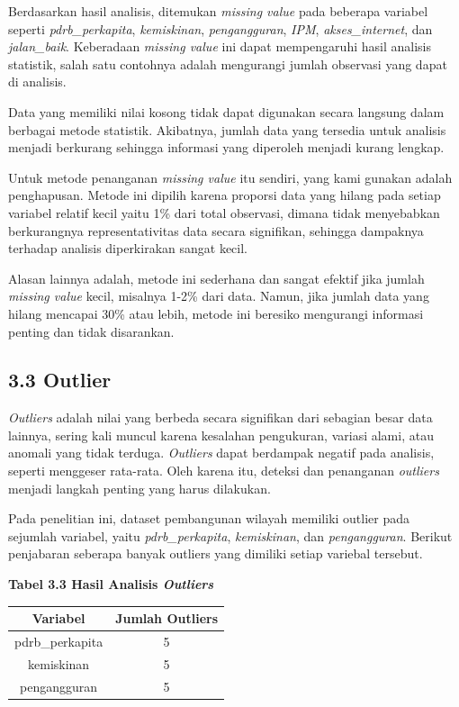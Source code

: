 \documentclass[
  12pt,
]{article}
\begin{document}
Berdasarkan hasil analisis, ditemukan \textit{missing value} pada
beberapa variabel seperti \textit{pdrb\_perkapita}, \textit{kemiskinan},
\textit{pengangguran}, \textit{IPM}, \textit{akses\_internet}, dan
\textit{jalan\_baik}. Keberadaan \textit{missing value} ini dapat
mempengaruhi hasil analisis statistik, salah satu contohnya adalah
mengurangi jumlah observasi yang dapat di analisis.

Data yang memiliki nilai kosong tidak dapat digunakan secara langsung
dalam berbagai metode statistik. Akibatnya, jumlah data yang tersedia
untuk analisis menjadi berkurang sehingga informasi yang diperoleh
menjadi kurang lengkap.

Untuk metode penanganan \textit{missing value} itu sendiri, yang kami
gunakan adalah penghapusan. Metode ini dipilih karena proporsi data yang
hilang pada setiap variabel relatif kecil yaitu 1\% dari total
observasi, dimana tidak menyebabkan berkurangnya representativitas data
secara signifikan, sehingga dampaknya terhadap analisis diperkirakan
sangat kecil.

Alasan lainnya adalah, metode ini sederhana dan sangat efektif jika
jumlah \textit{missing value} kecil, misalnya 1-2\% dari data. Namun,
jika jumlah data yang hilang mencapai 30\% atau lebih, metode ini
beresiko mengurangi informasi penting dan tidak disarankan.

\subsection{\texorpdfstring{\normalsize 3.3 \hspace {0,5cm}
Outlier}{3.3  Outlier}}\label{outlier}

\textit{Outliers} adalah nilai yang berbeda secara signifikan dari
sebagian besar data lainnya, sering kali muncul karena kesalahan
pengukuran, variasi alami, atau anomali yang tidak terduga.
\textit{Outliers} dapat berdampak negatif pada analisis, seperti
menggeser rata-rata. Oleh karena itu, deteksi dan penanganan
\textit{outliers} menjadi langkah penting yang harus dilakukan.

Pada penelitian ini, dataset pembangunan wilayah memiliki outlier pada
sejumlah variabel, yaitu \textit{pdrb\_perkapita}, \textit{kemiskinan},
dan \textit{pengangguran}. Berikut penjabaran seberapa banyak outliers
yang dimiliki setiap variebal tersebut.

\begin{center}
  \textbf{Tabel 3.3 Hasil Analisis \textit{Outliers}}
  
  \begin{tabular}{|c|c|}
  \hline
  \textbf{Variabel} & \textbf{Jumlah Outliers} \\
  \hline
  pdrb\_perkapita & 5 \\
  \hline
  kemiskinan & 5 \\
  \hline
  pengangguran & 5 \\
  \hline
  \end{tabular}
\end{center}
\end{document}
